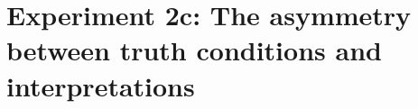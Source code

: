 \documentclass[12pt,letterpaper]{article}
\newcommand{\ndg}[1]{\textcolor{Green}{[ndg: #1]}}
\begin{document}
%

\section*{Experiment 2c: The asymmetry between truth conditions and interpretations}
\end{document}
